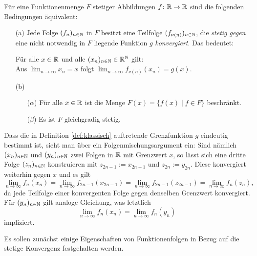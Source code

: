 \begin{defn} 
  \label{def:klassisch}
  Für eine Funktionenmenge $F$ stetiger Abbildungen $f \colon \mathbb{R} \to \mathbb{R}$ sind die folgenden Bedingungen äquivalent:
  \begin{itemize}
    \item[(a)] Jede Folge $(f_n)_{n \in \mathbb{N}}$ in $F$ besitzt eine Teilfolge $(f_{\nu(n)})_{n \in \mathbb{N}}$, die \textit{stetig gegen} eine nicht notwendig in $F$ liegende Funktion $g$ \textit{konvergiert}. Das bedeutet:
      \begin{addmargin}[2em]{2em}%
        Für alle $x \in \mathbb{R}$ und alle $(x_n)_{n \in \mathbb{N}} \in \mathbb{R}^{\mathbb{N}}$ gilt: \\
        Aus $\lim_{n \to \infty} x_n = x$ folgt $\lim_{n \to \infty} f_{\nu(n)}(x_n) = g(x)$.
      \end{addmargin}
    \item[(b)]
      \begin{itemize}
        \item[($\alpha$)] Für alle $x \in \mathbb{R}$ ist die Menge $F(x) = \{ f(x) \mid f \in F\}$ beschränkt.
        \item[($\beta$)] Es ist $F$ gleichgradig stetig.
      \end{itemize}
  \end{itemize}
\end{defn}

Dass die in Definition \ref{def:klassisch} auftretende Grenzfunktion $g$ eindeutig bestimmt ist, sieht man über ein Folgenmischungsargument ein:
Sind nämlich $(x_n)_{n \in \mathbb{N}}$ und $(y_n)_{n \in \mathbb{N}}$ zwei Folgen in $\mathbb{R}$ mit Grenzwert $x$, so lässt sich eine dritte Folge $(z_n)_{n \in \mathbb{N}}$ konstruieren mit $z_{2n-1} := x_{2n-1}$ und $z_{2n} := y_{2n}$.
Diese konvergiert weiterhin gegen $x$ und es gilt 
\begin{displaymath}
   \lim_{n \to \infty} f_{n}(x_n) 
  =\lim_{n \to \infty} f_{2n-1}(x_{2n-1}) 
  =\lim_{n \to \infty} f_{2n-1}(z_{2n-1}) 
  =\lim_{n \to \infty} f_n(z_n),
\end{displaymath}
da jede Teilfolge einer konvergenten Folge gegen denselben Grenzwert konvergiert.
Für $(y_n)_{n \in \mathbb{N}}$ gilt analoge Gleichung, was letztlich
\begin{displaymath}
   \lim_{n \to \infty} f_{n}(x_n) = \lim_{n \to \infty} f_{n}(y_n) 
\end{displaymath}
impliziert.

Es sollen zunächst einige Eigenschaften von Funktionenfolgen in Bezug auf die stetige Konvergenz festgehalten werden.

